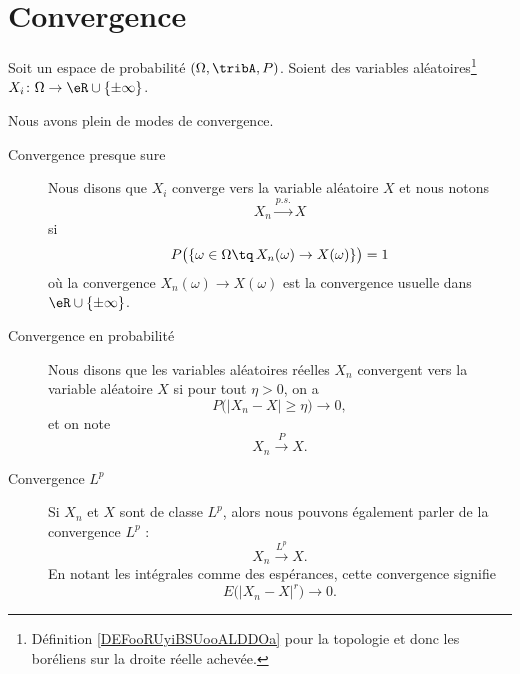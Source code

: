 \section{Convergence}


\begin{definition}      \label{DEFooZKLFooZkKuMC}
	Soit un espace de probabilité \( (\Omega,\tribA,P)\). Soient des variables aléatoires\footnote{Définition \ref{DEFooRUyiBSUooALDDOa} pour la topologie et donc les boréliens sur la droite réelle achevée.} \( X_i\colon \Omega\to \eR\cup\{ \pm\infty \}\).

	Nous avons plein de modes de convergence.
	\begin{description}
		\item[Convergence presque sure]

			Nous disons que \( X_i\) converge  vers la variable aléatoire \( X\) et nous notons
			\begin{equation}
				X_n\stackrel{p.s.}{\longrightarrow}X
			\end{equation}
			si
			\begin{equation}
				P\big( \{ \omega\in\Omega\tq\,X_n(\omega)\to X(\omega) \} \big)=1
			\end{equation}
			où la convergence \( X_n(\omega)\to X(\omega)\) est la convergence usuelle dans \( \eR\cup\{ \pm\infty \}\).
		\item[Convergence en probabilité]
			Nous disons que les variables aléatoires réelles \( X_n\) convergent  vers la variable aléatoire \( X\) si pour tout \( \eta>0\), on a
			\begin{equation}
				P\big( | X_n-X |\geq \eta \big)\to 0,
			\end{equation}
			et on note
			\begin{equation}
				X_n\stackrel{P}{\longrightarrow}X.
			\end{equation}

		\item[Convergence \( L^p\)]
			Si \( X_n\) et \( X\) sont de classe \( L^p\), alors nous pouvons également parler de la convergence \( L^p\) :
			\begin{equation}
				X_n\stackrel{ L^p}{\longrightarrow} X.
			\end{equation}
			En notant les intégrales comme des espérances, cette convergence signifie
			\begin{equation}
				E\big( | X_n-X |^r \big)\to 0.
			\end{equation}


\end{description}
\end{definition}
